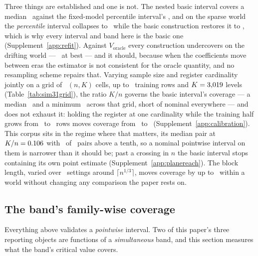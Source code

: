 \documentclass[11pt,3p,review,authoryear]{elsarticle}
\theoremstyle{definition}
\begin{document}
Three things are established and one is not. The nested basic interval
covers a median \coverageNestedBasicMedian\ against the fixed-model
percentile interval's \coverageNaiveMedian, and on the sparse world the
\emph{percentile} interval collapses to \coverageSparsePct\ while the basic
construction restores it to \coverageSparseBasic, which is why every interval
and band here is the basic one (Supplement~\ref{app:refit}). Against
$V_{\mathrm{oracle}}$ every construction undercovers on the drifting world
--- \coverageDriftOracle\ at best --- and it should, because when the
coefficients move between eras the estimator is not consistent for the
oracle quantity, and no resampling scheme repairs that. Varying sample size
and register cardinality jointly on a grid of \nSimGridCells\ $(n, K)$
cells, up to \simNMax\ training rows and $K = 3{,}019$ levels
(Table~\ref{tab:sim31grid}), the ratio $K/n$ governs the basic interval's
coverage --- a median \coverageGridMedian\ and a minimum \coverageGridMin\
across that grid, short
of nominal everywhere --- and does not exhaust it: holding the register at
one cardinality while the training half grows from \simGridFixedNa\ to
\simGridFixedNb\ rows moves coverage from \simGridFixedCovA\ to
\simGridFixedCovB\ (Supplement~\ref{app:calibration}). This corpus sits in
the regime where that matters, its median pair at $K/n = 0.106$
with \nPairsRatioAboveTenth\ of \nPairs\ pairs above a tenth, so a nominal
pointwise interval on them is narrower than it should be; past a crossing in
$n$ the basic interval stops containing its own point estimate
(Supplement~\ref{app:planereach}). The block length, varied over
\nSimBlockLengths\ settings around $\lceil n^{1/3} \rceil$, moves coverage by
up to \coverageBlockSpreadMaxPts\ within a world without changing any
comparison the paper rests on.

\subsection{The band's family-wise coverage}
\label{sec:simband}

Everything above validates a \emph{pointwise} interval. Two of this paper's
three reporting objects are functions of a \emph{simultaneous} band, and this
section measures what the band's critical value covers.
\end{document}
